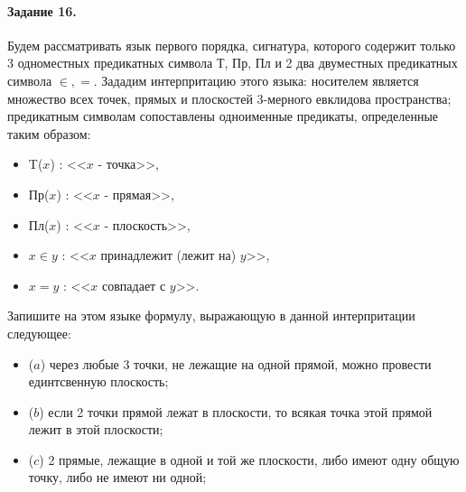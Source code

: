 \documentclass[a4paper,12pt]{article}
\begin{document}
\paragraph{Задание 16.} Будем рассматривать язык первого порядка, сигнатура, которого содержит только 3 одноместных предикатных символа Т, Пр, Пл и 2 два двуместных предикатных символа $\in, =$. Зададим интерпритацию этого языка: носителем является множество всех точек, прямых и плоскостей 3-мерного евклидова пространства; предикатным символам сопоставлены одноименные предикаты, определенные таким образом:
\begin{itemize}
\item T($x$) : <<$x$ - точка>>,

\item Пр($x$) : <<$x$ - прямая>>,

\item Пл($x$) : <<$x$ - плоскость>>,

\item $x \in y$ : <<$x$ принадлежит (лежит на) $y$>>,

\item $x = y$ : <<$x$ совпадает с $y$>>.
\end{itemize}

Запишите на этом языке формулу, выражающую в данной интерпритации следующее:
\begin{itemize}
\item ($a$) через любые 3 точки, не лежащие на одной прямой, можно провести единтсвенную плоскость;

\item ($b$) если 2 точки прямой лежат в плоскости, то всякая точка этой прямой лежит в этой плоскости;

\item ($c$) 2 прямые, лежащие в одной и той же плоскости, либо имеют одну общую точку, либо не имеют ни одной;
\end{itemize}
\end{document}
